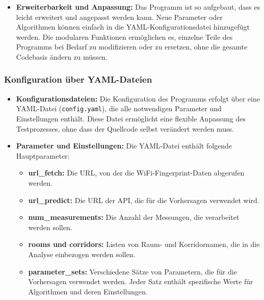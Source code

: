 \begin{itemize}
    \item \textbf{Erweiterbarkeit und Anpassung:} Das Programm ist so aufgebaut, dass es leicht erweitert und angepasst werden kann. Neue Parameter oder Algorithmen können einfach in die YAML-Konfigurationsdatei hinzugefügt werden. Die modularen Funktionen ermöglichen es, einzelne Teile des Programms bei Bedarf zu modifizieren oder zu ersetzen, ohne die gesamte Codebasis ändern zu müssen.
\end{itemize}

\subsubsection{Konfiguration über YAML-Dateien}
\begin{itemize}
    \item \textbf{Konfigurationsdateien:} Die Konfiguration des Programms erfolgt über eine YAML-Datei (\texttt{config.yaml}), die alle notwendigen Parameter und Einstellungen enthält. Diese Datei ermöglicht eine flexible Anpassung des Testprozesses, ohne dass der Quellcode selbst verändert werden muss.

    \item \textbf{Parameter und Einstellungen:} Die YAML-Datei enthält folgende Hauptparameter:
          \begin{itemize}
              \item \textbf{url\_fetch:} Die URL, von der die WiFi-Fingerprint-Daten abgerufen werden.
              \item \textbf{url\_predict:} Die URL der API, die für die Vorhersagen verwendet wird.
              \item \textbf{num\_measurements:} Die Anzahl der Messungen, die verarbeitet werden sollen.
              \item \textbf{rooms und corridors:} Listen von Raum- und Korridornamen, die in die Analyse einbezogen werden sollen.
              \item \textbf{parameter\_sets:} Verschiedene Sätze von Parametern, die für die Vorhersagen verwendet werden. Jeder Satz enthält spezifische Werte für Algorithmen und deren Einstellungen.
          \end{itemize}


\end{itemize}
